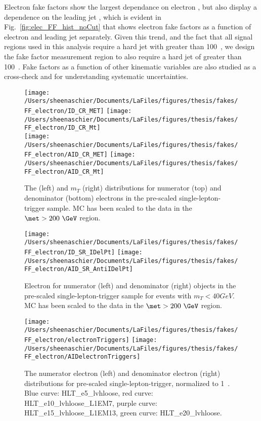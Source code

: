 Electron fake factors show the largest dependance on electron \pt{}, but also display a dependence on the leading jet \pt{}, which is evident in Fig.~\ref{fig:elec_FF_hist_noCut} that shows electron fake factors as a function of electron \pt{} and leading jet \pt{} separately. Given this trend, and the fact that all signal regions used in this analysis require a hard jet with \pt{} greater than 100~\GeV, we design the fake factor measurement region to also require a hard jet of \pt{} greater than 100~\GeV.  Fake factors as a function of other kinematic variables are also studied as a cross-check and for understanding systematic uncertainties.



\begin{figure}[tbp]
  \centering
  \texttt{[image: /Users/sheenaschier/Documents/LaFiles/figures/thesis/fakes/FF\_electron/ID\_CR\_MET]}
  \texttt{[image: /Users/sheenaschier/Documents/LaFiles/figures/thesis/fakes/FF\_electron/ID\_CR\_Mt]}\\
  \texttt{[image: /Users/sheenaschier/Documents/LaFiles/figures/thesis/fakes/FF\_electron/AID\_CR\_MET]}
  \texttt{[image: /Users/sheenaschier/Documents/LaFiles/figures/thesis/fakes/FF\_electron/AID\_CR\_Mt]}
  \caption{The \met{} (left) and $m_{T}$ (right) distributions for numerator (top) and denominator (bottom) electrons in the pre-scaled single-lepton-trigger sample.  MC has been scaled to the data in the $\met > 200~\GeV$ region.}
  \label{fig:elec_FF_dists_1}
\end{figure}

\begin{figure}[tbp]
  \centering
  \texttt{[image: /Users/sheenaschier/Documents/LaFiles/figures/thesis/fakes/FF\_electron/ID\_SR\_IDelPt]}
  \texttt{[image: /Users/sheenaschier/Documents/LaFiles/figures/thesis/fakes/FF\_electron/AID\_SR\_AntiIDelPt]}\\
  \caption{Electron \pt{} for numerator (left) and denominator (right) objects in the pre-scaled single-lepton-trigger sample for events with $m_{T} < 40 GeV$.  MC has been scaled to the data in the $\met > 200~\GeV$ region.}
  \label{fig:elec_FF_dists_pt}
\end{figure}

\begin{figure}[tbp]
  \centering
  \texttt{[image: /Users/sheenaschier/Documents/LaFiles/figures/thesis/fakes/FF\_electron/electronTriggers]}
  \texttt{[image: /Users/sheenaschier/Documents/LaFiles/figures/thesis/fakes/FF\_electron/AIDelectronTriggers]}\\
  \caption{The numerator electron (left) and denominator electron (right) \pt{} distributions for pre-scaled single-lepton-trigger, normalized to 1~\ipb{}. Blue curve: HLT\_e5\_lvhloose, red curve: HLT\_e10\_lvhloose\_L1EM7, purple curve: HLT\_e15\_lvhloose\_L1EM13, green curve: HLT\_e20\_lvhloose.}
  \label{fig:triggers}
\end{figure}


